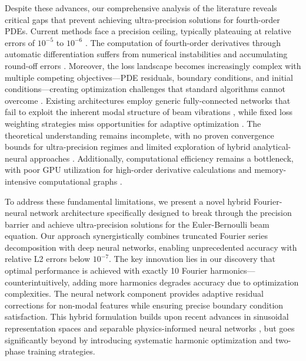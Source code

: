 Despite these advances, our comprehensive analysis of the literature reveals critical gaps that prevent achieving ultra-precision solutions for fourth-order PDEs. Current methods face a precision ceiling, typically plateauing at relative errors of $10^{-5}$ to $10^{-6}$ \cite{vahab2022physics,kapoor2023physics}. The computation of fourth-order derivatives through automatic differentiation suffers from numerical instabilities and accumulating round-off errors \cite{hu2024hutchinson}. Moreover, the loss landscape becomes increasingly complex with multiple competing objectives—PDE residuals, boundary conditions, and initial conditions—creating optimization challenges that standard algorithms cannot overcome \cite{wang2021understanding,krishnapriyan2021characterizing}. Existing architectures employ generic fully-connected networks that fail to exploit the inherent modal structure of beam vibrations \cite{brunton2024machine}, while fixed loss weighting strategies miss opportunities for adaptive optimization \cite{mcclenny2023self}. The theoretical understanding remains incomplete, with no proven convergence bounds for ultra-precision regimes and limited exploration of hybrid analytical-neural approaches \cite{arzani2023theory,cho2024separable}. Additionally, computational efficiency remains a bottleneck, with poor GPU utilization for high-order derivative calculations and memory-intensive computational graphs \cite{jagtap2020conservative}.

To address these fundamental limitations, we present a novel hybrid Fourier-neural network architecture specifically designed to break through the precision barrier and achieve ultra-precision solutions for the Euler-Bernoulli beam equation. Our approach synergistically combines truncated Fourier series decomposition with deep neural networks, enabling unprecedented accuracy with relative L2 errors below $10^{-7}$. The key innovation lies in our discovery that optimal performance is achieved with exactly 10 Fourier harmonics—counterintuitively, adding more harmonics degrades accuracy due to optimization complexities. The neural network component provides adaptive residual corrections for non-modal features while ensuring precise boundary condition satisfaction. This hybrid formulation builds upon recent advances in sinusoidal representation spaces \cite{wong2022learning} and separable physics-informed neural networks \cite{cho2024separable}, but goes significantly beyond by introducing systematic harmonic optimization and two-phase training strategies.

